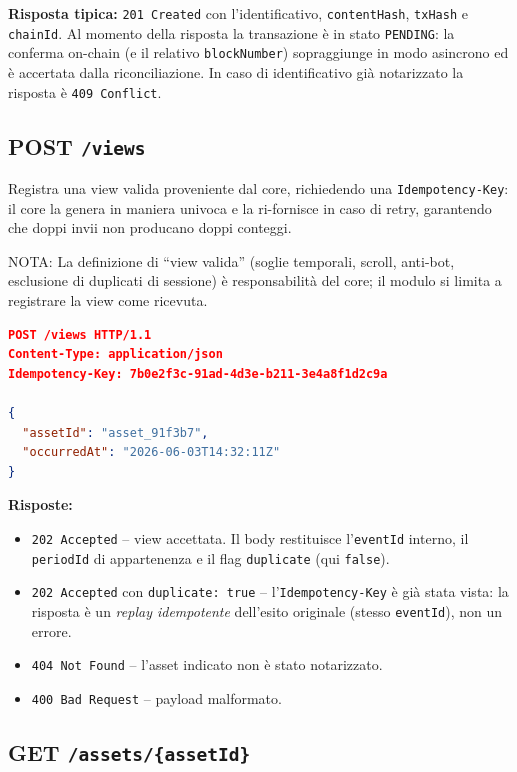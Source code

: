 \documentclass[a4paper,11pt]{article}
\begin{document}
\noindent \textbf{Risposta tipica:} \texttt{201 Created} con l'identificativo, \texttt{contentHash}, \texttt{txHash} e \texttt{chainId}. Al momento della risposta la transazione \`e in stato \texttt{PENDING}: la conferma on-chain (e il relativo \texttt{blockNumber}) sopraggiunge in modo asincrono ed \`e accertata dalla riconciliazione. In caso di identificativo gi\`a notarizzato la risposta \`e \texttt{409 Conflict}.

\subsection{POST \texttt{/views}}

Registra una view valida proveniente dal core, richiedendo una \texttt{Idempotency-Key}: il core la genera in maniera univoca e la ri-fornisce in caso di retry, garantendo che doppi invii non producano doppi conteggi.

NOTA: La definizione di ``view valida'' (soglie temporali, scroll, anti-bot, esclusione di duplicati di sessione) \`e responsabilit\`a del core; il modulo si limita a registrare la view come ricevuta. 

\begin{lstlisting}[language=json, caption={Esempio di richiesta a \texttt{POST /views}.}]
POST /views HTTP/1.1
Content-Type: application/json
Idempotency-Key: 7b0e2f3c-91ad-4d3e-b211-3e4a8f1d2c9a

{
  "assetId": "asset_91f3b7",
  "occurredAt": "2026-06-03T14:32:11Z"
}
\end{lstlisting}

\noindent \textbf{Risposte:}
\begin{itemize}[leftmargin=*, itemsep=0.1em]
    \item \texttt{202 Accepted} -- view accettata. Il body restituisce l'\texttt{eventId} interno, il \texttt{periodId} di appartenenza e il flag \texttt{duplicate} (qui \texttt{false}).
    \item \texttt{202 Accepted} con \texttt{duplicate: true} -- l'\texttt{Idempotency-Key} \`e gi\`a stata vista: la risposta \`e un \emph{replay idempotente} dell'esito originale (stesso \texttt{eventId}), non un errore.
    \item \texttt{404 Not Found} -- l'asset indicato non \`e stato notarizzato.
    \item \texttt{400 Bad Request} -- payload malformato.
\end{itemize}

\subsection{GET \texttt{/assets/\{assetId\}}}
\end{document}
